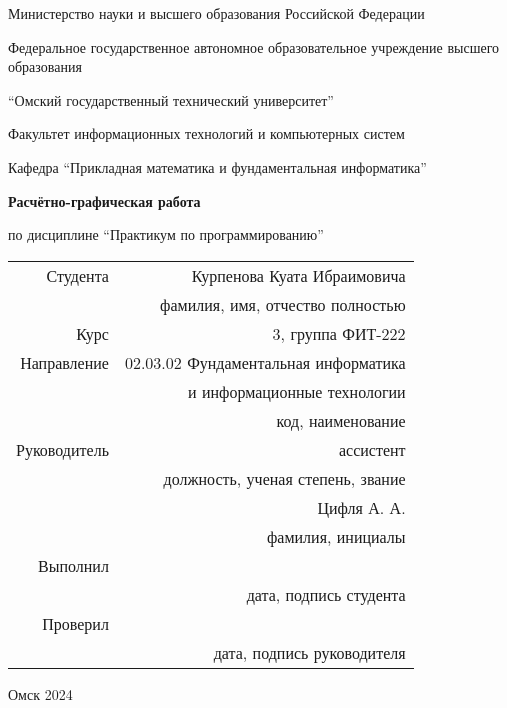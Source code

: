 \thispagestyle{empty}

\begin{center}
    Министерство науки и высшего образования Российской Федерации

    Федеральное государственное автономное образовательное учреждение высшего образования

    \enquote{Омский государственный технический университет}

    \vspace{1cm}
    Факультет информационных технологий и компьютерных систем

    Кафедра \enquote{Прикладная математика и фундаментальная информатика}

    \vspace{4cm}
    \textbf{Расчётно-графическая работа}

    по дисциплине \enquote{Практикум по программированию}
\end{center}

\vspace{2cm}
\begin{flushright}    
    \begin{tabular}{ r r }
        Студента & Курпенова Куата Ибраимовича \\
        \cline{2-2}
        & \tiny{фамилия, имя, отчество полностью} \\

        Курс & 3, группа ФИТ-222 \\
        \cline{2-2}
        Направление & 02.03.02 Фундаментальная информатика \\
        \cline{2-2}
        & и информационные технологии \\
        \cline{2-2}
        & \tiny{код, наименование} \\

        Руководитель & ассистент \\
        \cline{2-2}
        & \tiny{должность, ученая степень, звание} \\
        & Цифля А. А. \\
        \cline{2-2}
        & \tiny{фамилия, инициалы} \\

        Выполнил & \\
        \cline{2-2}
        & \tiny{дата, подпись студента} \\

        Проверил & \\
        \cline{2-2}
        & \tiny{дата, подпись руководителя} \\

    \end{tabular}
\end{flushright}

\vspace*{\fill}
\begin{center}
    Омск 2024
\end{center}
